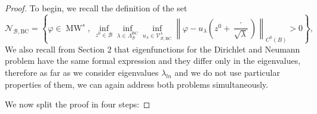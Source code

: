 \documentclass{amsart}
\theoremstyle{definition}
\theoremstyle{remark}
\numberwithin{equation}{section}
\theoremstyle{definition}
\theoremstyle{remark}
\DeclareMathOperator\MW{MW}
\begin{document}
\begin{proof}	 
	To begin, we recall the definition of the set \begin{equation}
		\mathcal{N}_{\mathcal B,\mathrm{BC}}=\left\{\varphi\in \MW^s,\ \inf_{ z^0\in\mathcal B}\inf_{\lambda\in \Lambda_\mathcal{B}^{\mathrm{BC}}}\inf_{u_\lambda\in\mathcal{V}_{\mathcal{B},\mathrm{BC}}^\lambda}
       \left\|\varphi-u_\lambda\left(z^0+\frac{\cdot}{\sqrt{\lambda}}\right)\right\|_{C^0\left(B\right)}>0\right\},
	\end{equation} 
   We also recall from Section 2 that eigenfunctions for the Dirichlet and Neumann problem have the same formal expression and they differ only in the eigenvalues, therefore as far as we consider eigenvalues $\lambda_{ln}$ and we do not use particular properties of them, we can again address both problems simultaneously.

    
    We now split the proof in four steps: 
     

\end{proof}
\end{document}
